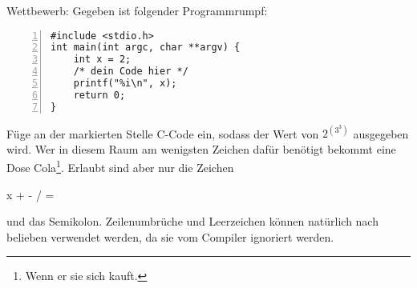 \documentclass{uebungszettel}
\begin{document}
\begin{aufg}
Wettbewerb: Gegeben ist folgender Programmrumpf:
\begin{codelisting}
\begin{lstlisting}[numbers=left,numberstyle=\tiny,frame=tlrb]
#include <stdio.h>
int main(int argc, char **argv) {
	int x = 2;
	/* dein Code hier */
	printf("%i\n", x);
	return 0;
}
\end{lstlisting}
\end{codelisting}
Füge an der markierten Stelle C-Code ein, sodass der Wert von $2^{\left(3^3\right)}$ ausgegeben wird. Wer in diesem Raum am wenigsten Zeichen dafür benötigt bekommt eine Dose Cola\footnote{Wenn er sie sich kauft.}. Erlaubt sind aber nur die Zeichen 
\begin{center}
	x \quad + \quad - \quad * \quad / \quad =
\end{center}
und das Semikolon. Zeilenumbrüche und Leerzeichen können natürlich nach belieben verwendet werden, da sie vom Compiler ignoriert werden.
\end{aufg}
\end{document}
